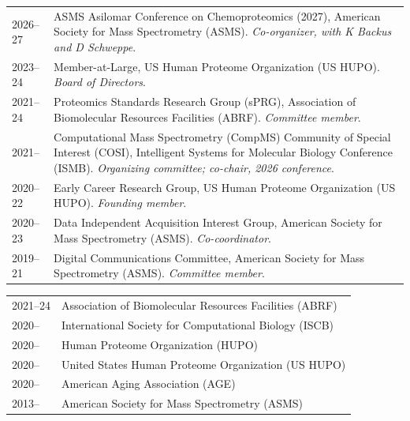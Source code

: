 \documentclass[11pt]{article}
\begin{document}
\begin{longtable}{V}
  2026--27 & ASMS Asilomar Conference on Chemoproteomics (2027), American Society for Mass Spectrometry (ASMS). \textit{Co-organizer, with K Backus and D Schweppe}. \\
  2023--24 & Member-at-Large, US Human Proteome Organization (US HUPO). \textit{Board of Directors}. \\
  2021--24 & Proteomics Standards Research Group (sPRG), Association of Biomolecular Resources Facilities (ABRF). \textit{Committee member}. \\
  2021-- & Computational Mass Spectrometry (CompMS) Community of Special Interest (COSI), Intelligent Systems for Molecular Biology Conference (ISMB). \textit{Organizing committee; co-chair, 2026 conference}. \\
  2020--22 & Early Career Research Group, US Human Proteome Organization (US HUPO). \textit{Founding member}. \\
  2020--23 & Data Independent Acquisition Interest Group, American Society for Mass Spectrometry (ASMS). \textit{Co-coordinator}. \\
  2019--21 & Digital Communications Committee, American Society for Mass Spectrometry (ASMS). \textit{Committee member}. \\
\end{longtable}

\begin{longtable}{V}
  2021--24     & Association of Biomolecular Resources Facilities (ABRF) \\
  2020--     & International Society for Computational Biology (ISCB) \\
  2020--     & Human Proteome Organization (HUPO) \\
  2020--     & United States Human Proteome Organization (US HUPO) \\
  2020--     & American Aging Association (AGE) \\
  2013--     & American Society for Mass Spectrometry (ASMS) \\
\end{longtable}
\end{document}
